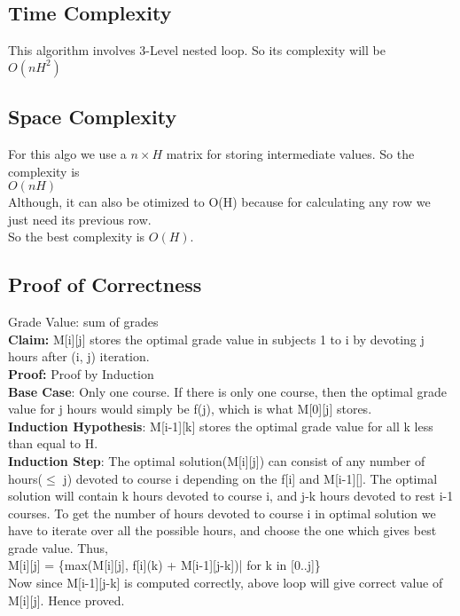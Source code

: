 \documentclass{article}
\begin{document}
\subsection{Time Complexity}
This algorithm involves 3-Level nested loop. So its complexity will be \\
\hspace*{2cm}$O(nH^2)$

\subsection{Space Complexity}
For this algo we use a $n \times H$ matrix for storing intermediate values. So the complexity is   \\
\hspace*{2cm}$O(nH)$  \\
Although, it can also be otimized to O(H) because for calculating any row we just need its previous row.\\
So the best complexity is $O(H)$.


\subsection{Proof of Correctness}
Grade Value: sum of grades\\
\textbf{Claim:} M[i][j] stores the optimal grade value in subjects 1 to i by devoting j hours after (i, j) iteration.\\
\textbf{Proof:} Proof by Induction\\
\textbf{Base Case}: Only one course. If there is only one course, then the optimal grade value for j hours would simply be f(j), which is what M[0][j] stores.\\
\textbf{Induction Hypothesis}: M[i-1][k] stores the optimal grade value for all k less than equal to H.\\
\textbf{Induction Step}: The optimal solution(M[i][j]) can consist of any number of hours($\leq$ j) devoted to course i depending on the f[i] and M[i-1][]. 
The optimal solution will contain k hours devoted to course i, and j-k hours devoted to rest i-1 courses. To get the number of hours devoted to course i in 
optimal solution we have to iterate over all the possible hours, and choose the one which gives best grade value. Thus,\\
\hspace*{2cm}M[i][j] = \{max(M[i][j], f[i](k) + M[i-1][j-k])| for k in [0..j]\} \\
Now since M[i-1][j-k] is computed correctly, above loop will give correct value of M[i][j].
Hence proved.
\end{document}
